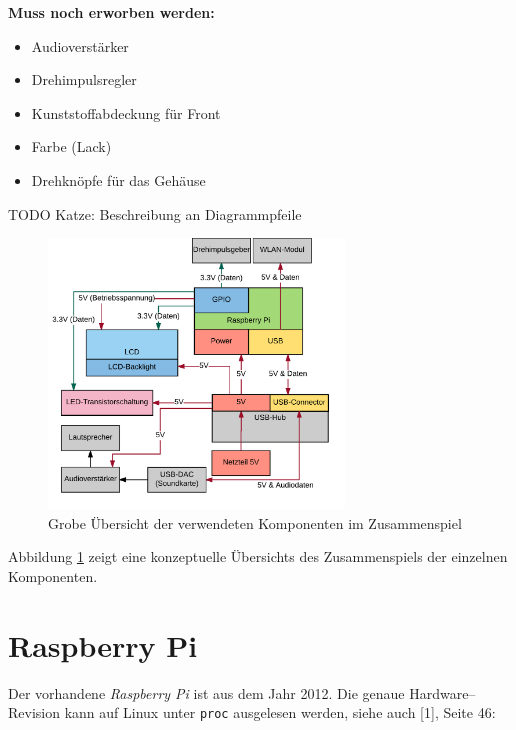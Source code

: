 \documentclass[11pt,ngerman,toc=listof,index=totoc]{scrreprt}
\providecommand{\tightlist}{%
  \setlength{\itemsep}{0pt}\setlength{\parskip}{0pt}}
\begin{document}
\textbf{Muss noch erworben werden:}

\begin{itemize}
\tightlist
\item
  Audioverstärker
\item
  Drehimpulsregler
\item
  Kunststoffabdeckung für Front
\item
  Farbe (Lack)
\item
  Drehknöpfe für das Gehäuse
\end{itemize}

TODO Katze: Beschreibung an Diagrammpfeile

\begin{figure}[h!]
  \centering
  \includegraphics[width=0.7\textwidth]{images/uebersicht.png}
  \caption{Grobe Übersicht der verwendeten Komponenten im Zusammenspiel}
  \label{uebersicht}
\end{figure}

Abbildung \ref{uebersicht} zeigt eine konzeptuelle Übersichts des
Zusammenspiels der einzelnen Komponenten.

\section{Raspberry Pi}\label{raspberry-pi}

Der vorhandene \emph{Raspberry Pi} ist aus dem Jahr 2012. Die genaue
Hardware--Revision kann auf Linux unter \texttt{proc} ausgelesen werden,
siehe auch {[}1{]}, Seite 46:
\end{document}
